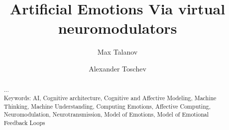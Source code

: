 \documentclass[oribibl]{llncs}
\begin{document}
\title{Artificial Emotions Via virtual neuromodulators}
\author{Max Talanov \and Alexander Toschev}
\begin{abstract}
...\\
Keywords: AI, Cognitive architecture, Cognitive and Affective Modeling, Machine Thinking, Machine Understanding, Computing Emotions, Affective Computing, Neuromodulation, Neurotransmission, Model of Emotions, Model of Emotional Feedback Loops
\end{abstract}

\maketitle


\end{document}

